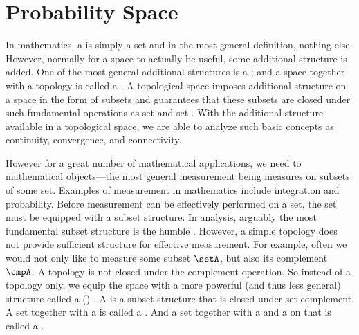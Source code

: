 
\section{Probability Space}
In mathematics, a  is simply a set and in the most general definition,
nothing else.
However, normally for a space to actually be useful, some additional structure is added.
One of the most general additional structures is a ;
and a space together with a topology is called a
.
A topological space imposes additional structure on a space  in the form of subsets
and guarantees that these subsets are closed under such fundamental operations as
set  and set .
With the additional structure available in a topological space, we are able to
analyze such basic concepts as
continuity,
convergence, and
connectivity.

However for a great number of mathematical applications,
we need to  mathematical objects---the most general measurement being measures on subsets of some set.
Examples of measurement in mathematics include integration and probability.
Before measurement can be effectively performed on a set,
the set must be equipped with a subset structure.
In analysis, arguably the most fundamental subset structure is the humble  .
However, a simple topology does not provide sufficient structure
for effective measurement.
For example,
often we would not only like to measure some subset $\setA$,
but also its complement $\cmpA$.
A topology is not closed under the complement operation.
So instead of a topology only, we equip the space with a more powerful (and thus less general) structure
called a  () .
A  is a subset structure that is closed under set complement.
A set together with a  is called a .
And a set together with a  and a  on that 
is called a  .

